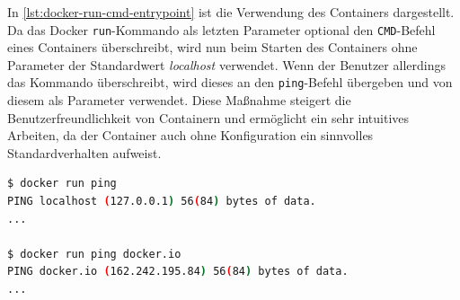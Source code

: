 In \cref{lst:docker-run-cmd-entrypoint} ist die Verwendung des Containers dargestellt.
Da das Docker \texttt{run}-Kommando als letzten Parameter optional den \texttt{CMD}-Befehl eines Containers überschreibt, wird nun beim Starten des Containers ohne Parameter der Standardwert \emph{localhost} verwendet.
Wenn der Benutzer allerdings das Kommando überschreibt, wird dieses an den \texttt{ping}-Befehl übergeben und von diesem als Parameter verwendet.
Diese Maßnahme steigert die Benutzerfreundlichkeit von Containern und ermöglicht ein sehr intuitives Arbeiten, da der Container auch ohne Konfiguration ein sinnvolles Standardverhalten aufweist.

\begin{lstlisting}[caption=Verwendung des \texttt{ping}-Containers, language=bash, label=lst:docker-run-cmd-entrypoint]
$ docker run ping
PING localhost (127.0.0.1) 56(84) bytes of data.
...

$ docker run ping docker.io
PING docker.io (162.242.195.84) 56(84) bytes of data.
...
\end{lstlisting}



